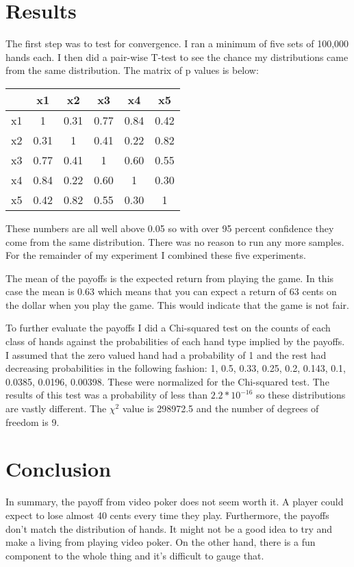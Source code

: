 \documentclass{article}
\begin{document}
\section{Results}
The first step was to test for convergence.  I ran a minimum of five sets of
100,000 hands each.  I then did a pair-wise T-test to see the chance my
distributions came from the same distribution.  The matrix of p values is below:
\begin{tabular}{|c||c|c|c|c|c|}
\hline 
   & x1   & x2   & x3   & x4   & x5   \\
\hline 
\hline 
x1 & 1    & 0.31 & 0.77 & 0.84 & 0.42 \\
\hline 
x2 & 0.31 & 1    & 0.41 & 0.22 & 0.82 \\
\hline 
x3 & 0.77 & 0.41 & 1    & 0.60 & 0.55 \\
\hline 
x4 & 0.84 & 0.22 & 0.60 & 1    & 0.30 \\
\hline 
x5 & 0.42 & 0.82 & 0.55 & 0.30 & 1    \\
\hline 
\end{tabular}

These numbers are all well above 0.05 so with over 95 percent confidence they
come from the same distribution.  There was no reason to run any more samples.
For the remainder of my experiment I combined these five experiments.

The mean of the payoffs is the expected return from playing the game.  In this
case the mean is 0.63 which means that you can expect a return of 63 cents on
the dollar when you play the game.  This would indicate that the game is not
fair.

To further evaluate the payoffs I did a Chi-squared test on the counts of
each class of hands against the probabilities of each hand type implied by 
the payoffs.  I assumed that the zero valued hand had a probability of 1
and the rest had decreasing probabilities in the following fashion: 1, 0.5,
0.33, 0.25, 0.2, 0.143, 0.1, 0.0385, 0.0196, 0.00398.  These were normalized
for the Chi-squared test.  The results of this test was a probability of
less than $2.2*10^{-16}$ so these distributions are vastly different.  The
$\chi^2$ value is 298972.5 and the number of degrees of freedom is 9.

\section{Conclusion}
In summary, the payoff from video poker does not seem worth it.  A player
could expect to lose almost 40 cents every time they play.  Furthermore, the
payoffs don't match the distribution of hands.  It might not be a good idea
to try and make a living from playing video poker.  On the other hand, there
is a fun component to the whole thing and it's difficult to gauge that.
\end{document}
